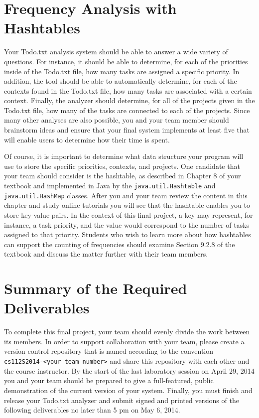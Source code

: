 \section*{Frequency Analysis with Hashtables}

  Your Todo.txt analysis system should be able to answer a wide variety of questions. For instance, it should be able to
  determine, for each of the priorities inside of the Todo.txt file, how many tasks are assigned a specific priority.
  In addition, the tool should be able to automatically determine, for each of the contexts found in the Todo.txt file,
  how many tasks are associated with a certain context. Finally, the analyzer should determine, for all of the projects
  given in the Todo.txt file, how many of the tasks are connected to each of the projects. Since many other analyses are
  also possible, you and your team member should brainstorm ideas and ensure that your final system implements at least
  five that will enable users to determine how their time is spent.

  Of course, it is important to determine what data structure your program will use to store the specific priorities,
  contexts, and projects.  One candidate that your team should consider is the hashtable, as described in Chapter 8 of
  your textbook and implemented in Java by the {\tt java.util.Hashtable} and {\tt java.util.HashMap} classes. After you
  and your team review the content in this chapter and study online tutorials you will see that the hashtable enables
  you to store key-value pairs.  In the context of this final project, a key may represent, for instance, a task
  priority, and the value would correspond to the number of tasks assigned to that priority. Students who wish to
  learn more about how hashtables can support the counting of frequencies should examine Section 9.2.8 of the textbook
  and discuss the matter further with their team members.


\section*{Summary of the Required Deliverables}

 To complete this final project, your team should evenly divide the work between its members.  In order to support
 collaboration with your team, please create a version control repository that is named according to the convention {\tt
 cs112S2014-<your team number>} and share this repository with each other and the course instructor. By the start of the
 last laboratory session on April 29, 2014 you and your team should be prepared to give a full-featured, public
 demonstration of the current version of your system. Finally, you must finish and release your Todo.txt analyzer and
 submit signed and printed versions of the following deliverables no later than 5 pm on May 6, 2014.

